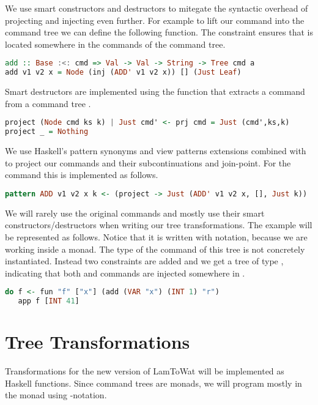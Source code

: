 We use smart constructors and destructors to mitegate the syntactic overhead of projecting and injecting \autocite{DBLP:conf/haskell/WuSH14, DBLP:conf/popl/LiangHJ95} even further. For example to lift our  command into the command tree we can define the following function. The constraint  ensures that  is located somewhere in the commands of the command tree.

\begin{lstlisting}[language=Haskell]
add :: Base :<: cmd => Val -> Val -> String -> Tree cmd a
add v1 v2 x = Node (inj (ADD' v1 v2 x)) [] (Just Leaf)
\end{lstlisting}

Smart destructors are implemented using the  function that extracts a command from a command tree .

\begin{lstlisting}[language=Haskell]
project (Node cmd ks k) | Just cmd' <- prj cmd = Just (cmd',ks,k)
project _ = Nothing
\end{lstlisting}

We use Haskell's pattern synonyms and view patterns extensions combined with  to project our commands and their subcontinuations and join-point. For the  command this is implemented as follows.

\begin{lstlisting}[language=Haskell]
pattern ADD v1 v2 x k <- (project -> Just (ADD' v1 v2 x, [], Just k))
\end{lstlisting}

We will rarely use the original commands and mostly use their smart constructors/destructors when writing our tree transformations. The  example will be represented as follows. Notice that it is written with  notation, because we are working inside a monad. The type of the command of this tree is not concretely instantiated. Instead two constraints are added and we get a tree of type , indicating that both  and  commands are injected somewhere in .

\begin{lstlisting}[language=Haskell]
do f <- fun "f" ["x"] (add (VAR "x") (INT 1) "r")
   app f [INT 41]
\end{lstlisting}

\section{\label{section:treensforms}Tree Transformations}
Transformations for the new version of LamToWat will be implemented as Haskell functions. Since command trees are monads, we will program mostly in the monad using -notation. 

